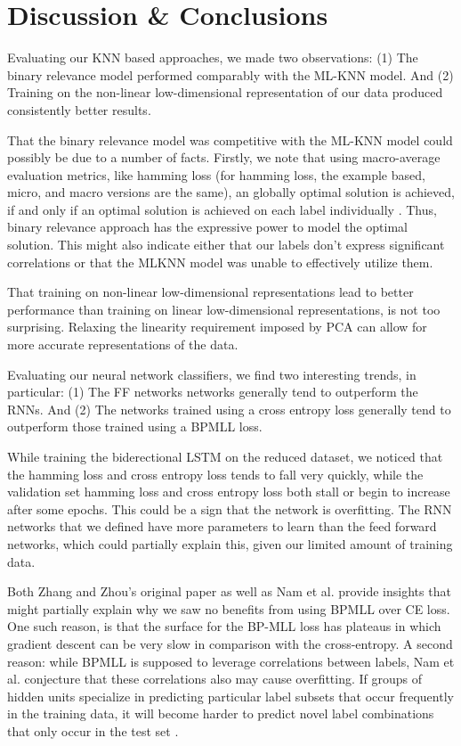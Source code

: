 \documentclass[11pt]{article}
\begin{document}
\section{Discussion \& Conclusions}

Evaluating our KNN based approaches, we made two observations: (1) The binary relevance model performed comparably with the ML-KNN model. And (2) Training on the non-linear low-dimensional representation of our data produced consistently better results. 

That the binary relevance model was competitive with the ML-KNN model could possibly be due to a number of facts. Firstly, we note that using macro-average evaluation metrics, like hamming loss (for hamming loss, the example based, micro, and macro versions are the same), an globally optimal solution is achieved, if and only if an optimal solution is achieved on each label individually \autocite{brEfficacy}. Thus, binary relevance approach has the expressive power to model the optimal solution. This might also indicate either that our labels don't express significant correlations or that the MLKNN model was unable to effectively utilize them.

That training on non-linear low-dimensional representations lead to better performance than training on linear low-dimensional representations, is not too surprising. Relaxing the linearity requirement imposed by PCA can allow for more accurate representations of the data.

Evaluating our neural network classifiers, we find two interesting trends, in particular: (1) The FF networks networks generally tend to outperform the RNNs. And (2) The networks trained using a cross entropy loss generally tend to outperform those trained using a BPMLL loss. 

While training the biderectional LSTM on the reduced dataset, we noticed that the hamming loss and cross entropy loss tends to fall very quickly, while the validation set hamming loss and cross entropy loss both stall or begin to increase after some epochs. This could be a sign that the network is overfitting. The RNN networks that we defined have more parameters to learn than the feed forward networks, which could partially explain this, given our limited amount of training data. 

Both Zhang and Zhou's original paper as well as Nam et al. \autocite{bp_mll_revisited} provide insights that might partially explain why we saw no benefits from using BPMLL over CE loss. One such reason, is that the surface for the BP-MLL loss has plateaus in which gradient descent can be very slow in comparison with the cross-entropy. A second reason: while BPMLL is supposed to leverage correlations between labels, Nam et al. conjecture that these correlations also may cause overfitting. If groups of hidden units specialize in predicting particular label subsets that occur frequently in the training data, it will become harder to predict novel label combinations that only occur in the test set \autocite{bp_mll_revisited}. 
\end{document}
